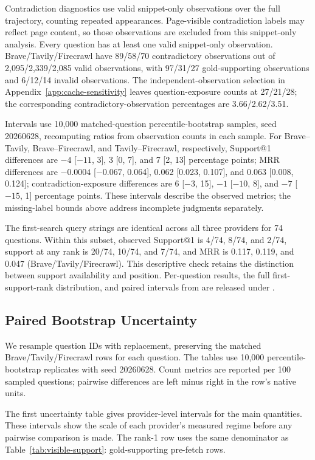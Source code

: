 Contradiction diagnostics use valid snippet-only observations over the full trajectory, counting repeated appearances. Page-visible contradiction labels may reflect page content, so those observations are excluded from this snippet-only analysis. Every question has at least one valid snippet-only observation. Brave/Tavily/Firecrawl have 89/58/70 contradictory observations out of 2,095/2,339/2,085 valid observations, with 97/31/27 gold-supporting observations and 6/12/14 invalid observations. The independent-observation selection in Appendix~\ref{app:cache-sensitivity} leaves question-exposure counts at 27/21/28; the corresponding contradictory-observation percentages are 3.66/2.62/3.51.

Intervals use 10,000 matched-question percentile-bootstrap samples, seed 20260628, recomputing ratios from observation counts in each sample. For Brave--Tavily, Brave--Firecrawl, and Tavily--Firecrawl, respectively, Support@1 differences are $-4$ [$-11$, 3], 3 [0, 7], and 7 [2, 13] percentage points; MRR differences are $-0.0004$ [$-0.067$, 0.064], 0.062 [0.023, 0.107], and 0.063 [0.008, 0.124]; contradiction-exposure differences are 6 [$-3$, 15], $-1$ [$-10$, 8], and $-7$ [$-15$, 1] percentage points. These intervals describe the observed metrics; the missing-label bounds above address incomplete judgments separately.

The first-search query strings are identical across all three providers for 74 questions. Within this subset, observed Support@1 is 4/74, 8/74, and 2/74, support at any rank is 20/74, 10/74, and 7/74, and MRR is 0.117, 0.119, and 0.047 (Brave/Tavily/Firecrawl). This descriptive check retains the distinction between support availability and position. Per-question results, the full first-support-rank distribution, and paired intervals from  are released under .

\subsection{Paired Bootstrap Uncertainty}
\label{app:uncertainty}
We resample question IDs with replacement, preserving the matched Brave/Tavily/Firecrawl rows for each question. The tables use 10,000 percentile-bootstrap replicates with seed 20260628. Count metrics are reported per 100 sampled questions; pairwise differences are left minus right in the row's native units.

The first uncertainty table gives provider-level intervals for the main quantities. These intervals show the scale of each provider's measured regime before any pairwise comparison is made. The rank-1 row uses the same denominator as Table~\ref{tab:visible-support}: gold-supporting pre-fetch rows.

